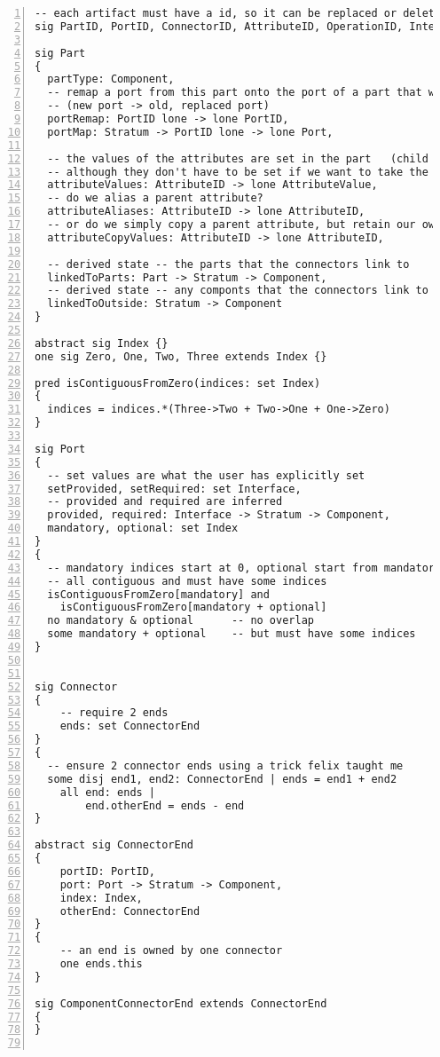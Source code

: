 \begin{lstlisting}[caption={structure.als}, numbers=left]
-- each artifact must have a id, so it can be replaced or deleted
sig PartID, PortID, ConnectorID, AttributeID, OperationID, InterfaceImplementationID {}

sig Part
{
  partType: Component,
  -- remap a port from this part onto the port of a part that we are replacing
  -- (new port -> old, replaced port)
  portRemap: PortID lone -> lone PortID,
  portMap: Stratum -> PortID lone -> lone Port,

  -- the values of the attributes are set in the part   (child id -> parent id)
  -- although they don't have to be set if we want to take the default
  attributeValues: AttributeID -> lone AttributeValue,
  -- do we alias a parent attribute?
  attributeAliases: AttributeID -> lone AttributeID,
  -- or do we simply copy a parent attribute, but retain our own state?
  attributeCopyValues: AttributeID -> lone AttributeID,

  -- derived state -- the parts that the connectors link to
  linkedToParts: Part -> Stratum -> Component,
  -- derived state -- any componts that the connectors link to
  linkedToOutside: Stratum -> Component
}

abstract sig Index {}
one sig Zero, One, Two, Three extends Index {}

pred isContiguousFromZero(indices: set Index)
{
  indices = indices.*(Three->Two + Two->One + One->Zero)
}

sig Port
{
  -- set values are what the user has explicitly set
  setProvided, setRequired: set Interface,
  -- provided and required are inferred
  provided, required: Interface -> Stratum -> Component,
  mandatory, optional: set Index
}
{
  -- mandatory indices start at 0, optional start from mandatory end, no overlap
  -- all contiguous and must have some indices
  isContiguousFromZero[mandatory] and
    isContiguousFromZero[mandatory + optional]
  no mandatory & optional      -- no overlap
  some mandatory + optional    -- but must have some indices
}


sig Connector
{
    -- require 2 ends
    ends: set ConnectorEnd
}
{
  -- ensure 2 connector ends using a trick felix taught me
  some disj end1, end2: ConnectorEnd | ends = end1 + end2
    all end: ends |
        end.otherEnd = ends - end
}

abstract sig ConnectorEnd
{
    portID: PortID,
    port: Port -> Stratum -> Component,
    index: Index,
    otherEnd: ConnectorEnd
}
{
    -- an end is owned by one connector
    one ends.this
}

sig ComponentConnectorEnd extends ConnectorEnd
{
}


\end{lstlisting}
